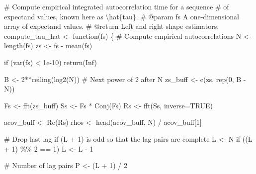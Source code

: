 \documentclass[
  letterpaper,
  DIV=11,
  numbers=noendperiod]{scrartcl}
\newenvironment{Shaded}{\begin{snugshade}}{\end{snugshade}}
\newcommand{\AttributeTok}[1]{\textcolor[rgb]{0.40,0.45,0.13}{#1}}
\newcommand{\CommentTok}[1]{\textcolor[rgb]{0.37,0.37,0.37}{#1}}
\newcommand{\ConstantTok}[1]{\textcolor[rgb]{0.56,0.35,0.01}{#1}}
\newcommand{\ControlFlowTok}[1]{\textcolor[rgb]{0.00,0.23,0.31}{#1}}
\newcommand{\DecValTok}[1]{\textcolor[rgb]{0.68,0.00,0.00}{#1}}
\newcommand{\FloatTok}[1]{\textcolor[rgb]{0.68,0.00,0.00}{#1}}
\newcommand{\FunctionTok}[1]{\textcolor[rgb]{0.28,0.35,0.67}{#1}}
\newcommand{\NormalTok}[1]{\textcolor[rgb]{0.00,0.23,0.31}{#1}}
\newcommand{\OtherTok}[1]{\textcolor[rgb]{0.00,0.23,0.31}{#1}}
\newcommand{\SpecialCharTok}[1]{\textcolor[rgb]{0.37,0.37,0.37}{#1}}
\begin{document}
\begin{Shaded}
\begin{Highlighting}[]
\CommentTok{\# Compute empirical integrated autocorrelation time for a sequence}
\CommentTok{\# of expectand values, known here as \textbackslash{}hat\{tau\}.}
\CommentTok{\# @param fs A one{-}dimensional array of expectand values.}
\CommentTok{\# @return Left and right shape estimators.}
\NormalTok{compute\_tau\_hat }\OtherTok{\textless{}{-}} \ControlFlowTok{function}\NormalTok{(fs) \{}
  \CommentTok{\# Compute empirical autocorrelations}
\NormalTok{  N }\OtherTok{\textless{}{-}} \FunctionTok{length}\NormalTok{(fs)}
\NormalTok{  zs }\OtherTok{\textless{}{-}}\NormalTok{ fs }\SpecialCharTok{{-}} \FunctionTok{mean}\NormalTok{(fs)}
  
  \ControlFlowTok{if}\NormalTok{ (}\FunctionTok{var}\NormalTok{(fs) }\SpecialCharTok{\textless{}} \FloatTok{1e{-}10}\NormalTok{)}
    \FunctionTok{return}\NormalTok{(}\ConstantTok{Inf}\NormalTok{)}

\NormalTok{  B }\OtherTok{\textless{}{-}} \DecValTok{2}\SpecialCharTok{**}\FunctionTok{ceiling}\NormalTok{(}\FunctionTok{log2}\NormalTok{(N)) }\CommentTok{\# Next power of 2 after N}
\NormalTok{  zs\_buff }\OtherTok{\textless{}{-}} \FunctionTok{c}\NormalTok{(zs, }\FunctionTok{rep}\NormalTok{(}\DecValTok{0}\NormalTok{, B }\SpecialCharTok{{-}}\NormalTok{ N))}

\NormalTok{  Fs }\OtherTok{\textless{}{-}} \FunctionTok{fft}\NormalTok{(zs\_buff)}
\NormalTok{  Ss }\OtherTok{\textless{}{-}}\NormalTok{ Fs }\SpecialCharTok{*} \FunctionTok{Conj}\NormalTok{(Fs)}
\NormalTok{  Rs }\OtherTok{\textless{}{-}} \FunctionTok{fft}\NormalTok{(Ss, }\AttributeTok{inverse=}\ConstantTok{TRUE}\NormalTok{)}

\NormalTok{  acov\_buff }\OtherTok{\textless{}{-}} \FunctionTok{Re}\NormalTok{(Rs)}
\NormalTok{  rhos }\OtherTok{\textless{}{-}} \FunctionTok{head}\NormalTok{(acov\_buff, N) }\SpecialCharTok{/}\NormalTok{ acov\_buff[}\DecValTok{1}\NormalTok{]}

  \CommentTok{\# Drop last lag if (L + 1) is odd so that the lag pairs are complete}
\NormalTok{  L }\OtherTok{\textless{}{-}}\NormalTok{ N}
  \ControlFlowTok{if}\NormalTok{ ((L }\SpecialCharTok{+} \DecValTok{1}\NormalTok{) }\SpecialCharTok{\%\%} \DecValTok{2} \SpecialCharTok{==} \DecValTok{1}\NormalTok{)}
\NormalTok{    L }\OtherTok{\textless{}{-}}\NormalTok{ L }\SpecialCharTok{{-}} \DecValTok{1}

  \CommentTok{\# Number of lag pairs}
\NormalTok{  P }\OtherTok{\textless{}{-}}\NormalTok{ (L }\SpecialCharTok{+} \DecValTok{1}\NormalTok{) }\SpecialCharTok{/} \DecValTok{2}


\end{Highlighting}
\end{Shaded}
\end{document}
